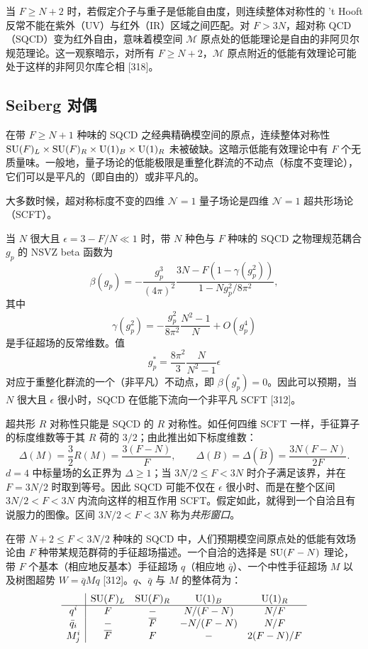 当 $F\ge N+2$ 时，若假定介子与重子是低能自由度，则连续整体对称性的 't Hooft 反常不能在紫外（UV）与红外（IR）区域之间匹配。对 $F>3N$，超对称 QCD（SQCD）变为红外自由，意味着模空间 $\mathcal{M}$ 原点处的低能理论是自由的非阿贝尔规范理论。这一观察暗示，对所有 $F\ge N+2$，$\mathcal{M}$ 原点附近的低能有效理论可能处于这样的非阿贝尔库仑相 [318]。

\subsection{Seiberg 对偶}

在带 $F\ge N+1$ 种味的 SQCD 之经典精确模空间的原点，连续整体对称性 $\operatorname{SU}(F)_L\times\operatorname{SU}(F)_R\times\operatorname{U}(1)_B\times\operatorname{U}(1)_R$ 未被破缺。这暗示低能有效理论中有 $F$ 个无质量味。一般地，量子场论的低能极限是重整化群流的不动点（标度不变理论），它们可以是平凡的（即自由的）或非平凡的。

大多数时候，超对称标度不变的四维 $\mathcal{N}=1$ 量子场论是四维 $\mathcal{N}=1$ 超共形场论（SCFT）。

当 $N$ 很大且 $\epsilon=3-F/N\ll1$ 时，带 $N$ 种色与 $F$ 种味的 SQCD 之物理规范耦合 $g_p$ 的 NSVZ beta 函数为
\[
\beta(g_p)=-\frac{g_p^3}{(4\pi)^2}\frac{3N-F(1-\gamma(g_p^2))}{1-Ng_p^2/8\pi^2},
\]
其中
\[
\gamma(g_p^2)=-\frac{g_p^2}{8\pi^2}\frac{N^2-1}{N}+O(g_p^4)
\]
是手征超场的反常维数。值
\[
g_p^*=\frac{8\pi^2}{3}\frac{N}{N^2-1}\epsilon
\]
对应于重整化群流的一个（非平凡）不动点，即 $\beta(g_p^*)=0$。因此可以预期，当 $N$ 很大且 $\epsilon$ 很小时，SQCD 在低能下流向一个非平凡 SCFT [312]。

超共形 $R$ 对称性只能是 SQCD 的 $R$ 对称性。如任何四维 SCFT 一样，手征算子的标度维数等于其 $R$ 荷的 $3/2$；由此推出如下标度维数：
\[
\Delta(M)=\frac{3}{2}R(M)=\frac{3(F-N)}{F},\qquad
\Delta(B)=\Delta(\tilde B)=\frac{3N(F-N)}{2F}.
\]
$d=4$ 中标量场的幺正界为 $\Delta\ge1$；当 $3N/2\le F<3N$ 时介子满足该界，并在 $F=3N/2$ 时取到等号。因此 SQCD 可能不仅在 $\epsilon$ 很小时、而是在整个区间 $3N/2<F<3N$ 内流向这样的相互作用 SCFT。假定如此，就得到一个自洽且有说服力的图像。区间 $3N/2<F<3N$ 称为\emph{共形窗口}。

在带 $N+2\le F<3N/2$ 种味的 SQCD 中，人们预期模空间原点处的低能有效场论由 $F$ 种带某规范群荷的手征超场描述。一个自洽的选择是 $\operatorname{SU}(F-N)$ 理论，带 $F$ 个基本（相应地反基本）手征超场 $q$（相应地 $\bar q$）、一个中性手征超场 $M$ 以及树图超势 $W=\bar qMq$ [312]。$q$、$\bar q$ 与 $M$ 的整体荷为：
\[
\begin{array}{c|cccc}
 & \operatorname{SU}(F)_L & \operatorname{SU}(F)_R & \operatorname{U}(1)_B & \operatorname{U}(1)_R\\ \hline
q^i & F & - & N/(F-N) & N/F\\
\bar q_i & - & \overline F & -N/(F-N) & N/F\\
M^i_j & \overline F & F & - & 2(F-N)/F
\end{array}
\]

